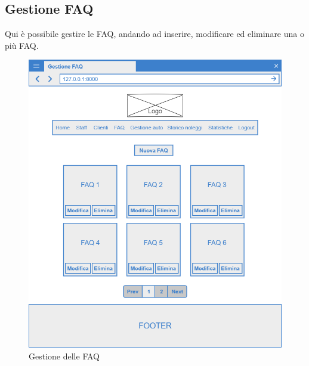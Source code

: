 \documentclass[12pt,a4paperS]{report}
\begin{document}
\begin{normalsize}
			\subsection{Gestione FAQ}
				Qui è possibile gestire le FAQ, andando ad inserire, modificare ed eliminare una o più FAQ.
				\begin{figure}[H]
					\centering
					\includegraphics[width=1\textwidth, height=1\textheight, keepaspectratio]{Mockup/Gestione_faq.png}
					\caption{Gestione delle FAQ}
				\end{figure}
			

\end{normalsize}
\end{document}
